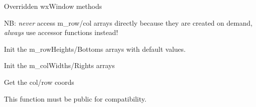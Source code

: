 \label{wxgridfit}


Overridden wxWindow methods

\label{wxgriddogetbestsize}


\label{wxgridinitrowheights}


NB: {\it never} access m\_row/col arrays directly because they are created
on demand, {\it always} use accessor functions instead!

Init the m\_rowHeights/Bottoms arrays with default values.

\label{wxgridinitcolwidths}


Init the m\_colWidths/Rights arrays


\label{wxgridgetcolwidth}


Get the col/row coords


\label{wxgridgetcolleft}



\label{wxgridgetcolright}



\label{wxgridgetrowheight}


This function must be public for compatibility.

\label{wxgridgetrowtop}



\label{wxgridgetrowbottom}



\label{wxgridsetorcalccolumnsizes}


